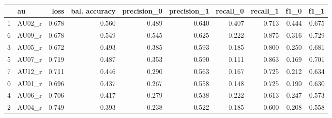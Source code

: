 \begin{tabular}{llrrrrrrrr}
\toprule
 & au & loss & bal. accuracy & precision_0 & precision_1 & recall_0 & recall_1 & f1_0 & f1_1 \\
\midrule
1 & AU02_r & 0.678 & 0.560 & 0.489 & 0.640 & 0.407 & 0.713 & 0.444 & 0.675 \\
6 & AU09_r & 0.678 & 0.549 & 0.545 & 0.625 & 0.222 & 0.875 & 0.316 & 0.729 \\
3 & AU05_r & 0.672 & 0.493 & 0.385 & 0.593 & 0.185 & 0.800 & 0.250 & 0.681 \\
5 & AU07_r & 0.719 & 0.487 & 0.353 & 0.590 & 0.111 & 0.863 & 0.169 & 0.701 \\
7 & AU12_r & 0.711 & 0.446 & 0.290 & 0.563 & 0.167 & 0.725 & 0.212 & 0.634 \\
0 & AU01_r & 0.696 & 0.437 & 0.267 & 0.558 & 0.148 & 0.725 & 0.190 & 0.630 \\
4 & AU06_r & 0.706 & 0.417 & 0.279 & 0.538 & 0.222 & 0.613 & 0.247 & 0.573 \\
2 & AU04_r & 0.749 & 0.393 & 0.238 & 0.522 & 0.185 & 0.600 & 0.208 & 0.558 \\
\bottomrule
\end{tabular}
